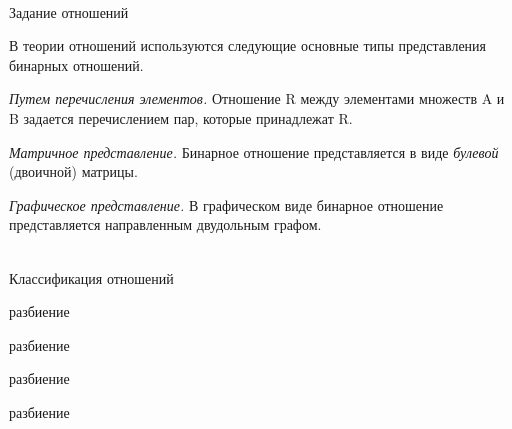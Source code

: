 \begin{frame}{\\Задание отношений}
	
	
	
	\topline
	\justifying
	
	В теории отношений используются следующие основные типы представления бинарных отношений.\\
	
	\begin{textitemize}
		\item {\textit{Путем перечисления элементов.} Отношение R между элементами множеств A и B задается перечислением пар, которые принадлежат R.}
		
		\item
		{ \textit{Матричное представление.} Бинарное отношение представляется в виде \textit{булевой} (двоичной) матрицы.} 
		
		\item{ \textit {Графическое представление.} В графическом виде бинарное отношение представляется направленным двудольным графом.}
		
	\end{textitemize}
	
\end{frame}

\begin{frame}{\\Классификация отношений}
	
	\topline
	\justifying
	
	\begin{SCn}
		
		\begin{scnrelfromset}{разбиение}
		\end{scnrelfromset}
		
		\begin{scnrelfromset}{разбиение}
		\end{scnrelfromset}
		
		\begin{scnrelfromset}{разбиение}
		\end{scnrelfromset}
		
		\begin{scnrelfromset}{разбиение}
		\end{scnrelfromset}
		
	\end{SCn}
\vspace{-2em}
\end{frame}

